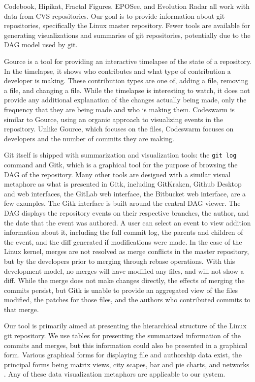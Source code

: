 Codebook, Hipikat, Fractal Figures, EPOSee, and Evolution Radar all work
with data from CVS repositories. Our goal is to provide information
about git repositories, specifically the Linux master repository. Fewer
tools are available for generating visualizations and summaries of git
repositories, potentially due to the DAG model used by git.

Gource is a tool for providing an interactive timelapse of the state of
a repository\cite{Caudwell2010}. In the timelapse, it shows who
contributes and what type of contribution a developer is making. These
contribution types are one of, adding a file, removing a file, and
changing a file. While the timelapse is interesting to watch, it does
not provide any additional explanation of the changes actually being
made, only the frequency that they are being made and who is making
them. Codeswarm\cite{ogawa09} is similar to Gource, using an organic
approach to visualizing events in the repository. Unlike Gource, which
focuses on the files, Codeswarm focuses on developers and the number of
commits they are making.

Git itself is shipped with summarization and visualization tools: the
\verb|git log| command and Gitk, which is a graphical tool for the
purpose of browsing the DAG of the repository. Many other tools are
designed with a similar visual metaphore as what is presented in Gitk,
including GitKraken, Github Desktop and web interfaces, the GitLab web
interface, the Bitbucket web interface, are a few examples. The Gitk
interface is built around the central DAG viewer. The DAG displays the
repository events on their respective branches, the author, and the date
that the event was authored. A user can select an event to view addition
information about it, including the full commit log, the parents and
children of the event, and the diff generated if modifications were
made. In the case of the Linux kernel, merges are not resolved as merge
conflicts in the master repository, but by the developers prior to
merging through rebase operations. With this development model, no
merges will have modified any files, and will not show a diff. While the
merge does not make changes directly, the effects of merging the commits
persist, but Gitk is unable to provide an aggregated view of the files
modified, the patches for those files, and the authors who contributed
commits to that merge.

Our tool is primarily aimed at presenting the hierarchical structure of
the Linux git repository. We use tables for presenting the summarized
information of the commits and merges, but this information could also
be presented in a graphical form. Various graphical forms for displaying
file and authorship data exist, the principal forms being matrix views,
city scapes, bar and pie charts, and networks \cite{Eick2002}. Any of
these data visualization metaphors are applicable to our system.

